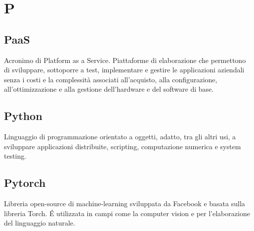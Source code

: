 \section*{P}
\markright{}
\subsection*{PaaS}
Acronimo di Platform as a Service. Piattaforme di elaborazione che permettono di sviluppare, sottoporre a test, implementare e gestire le applicazioni aziendali senza i costi e la complessità associati all'acquisto, alla configurazione, all'ottimizzazione e alla gestione dell'hardware e del software di base. 
\subsection*{Python}
Linguaggio di programmazione orientato a oggetti, adatto, tra gli altri usi, a sviluppare applicazioni distribuite, scripting, computazione numerica e system testing.
\subsection*{Pytorch}
Libreria open-source di machine-learning sviluppata da Facebook e basata sulla libreria Torch. \'E utilizzata in campi come la computer vision e per l'elaborazione del linguaggio naturale.